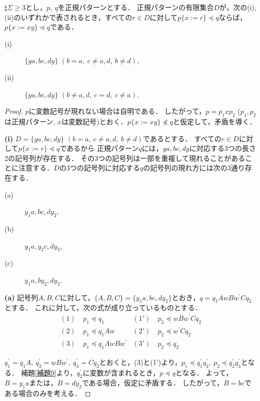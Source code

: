 
\begin{lem}\label{片方}
$\sharp \Sigma \ge 3$とし，$p,~q$を正規パターンとする．
正規パターンの有限集合$D$が，次の{\rm (i), (ii)}のいずれかで表されるとき，すべての$r \in D$に対して$p \{ x := r \} \preceq q$ならば，$p \{ x := xy \} \preceq q$である．

\begin{description}
\item[{\rm (i)}] $\{ ya, bc, dy \}$ $(b = a,~c \not = a,d,~b \not = d)$,
\item[{\rm (ii)}] $\{ ya, bc, dy \}$ $(b \not = a,d,~c = d,~c \not = a)$.
\end{description}
\end{lem}
\begin{proof}
$p$に変数記号が現れない場合は自明である．
したがって，$p=p_{1}xp_{2}$ ($p_{1}, p_{2}$は正規パターン, $x$は変数記号)とおく．$p \{ x := xy \} \not \preceq q$と仮定して，矛盾を導く．

\noindent\textbf{(i)}
$D=\{ ya, bc, dy \}$ $(b = a,~c \not = a,d,~b \not = d)$であるとする．
すべての$r \in D$に対して$p \{ x := r \} \preceq q$であるから
正規パターン$q$には，$ya, bc, dy$に対応する3つの長さ2の記号列が存在する．
その3つの記号列は一部を重複して現れることがあることに注意する．$D$の3つの記号列に対応する$q$の記号列の現れ方には次の3通り存在する．

\begin{description}
\item[(a)] $y_{1}a, bc, dy_{2}$,
\item[(b)] $y_{1}a, y_{2}c, dy_{3}$,
\item[(c)] $y_{1}a, by_{2}, dy_{3}$.
\end{description}

\textbf{(a)}
記号列$A,B,C$に対して，$\{ A,B,C \} = \{ y_{1}a,bc,dy_{2} \}$とおき，$q=q_{1}AwBw^{\prime}Cq_{2}$とする．
これに対して，次の式が成り立っているものとする．
\begin{align*}
(1)~& p_{1} \preceq q_{1} & (1')~& p_{2} \preceq wBw^{\prime}Cq_{2} \\
(2)~& p_{1} \preceq q_{1}Aw & (2')~& p_{2} \preceq w^{\prime}Cq_{2} \\
(3)~& p_{1} \preceq q_{1}AwBw^{\prime} & (3')~& p_{2} \preceq q_{2}
\end{align*}

$q^{\prime}_{1}=q_{1}A,~q^{\prime}_{2}=wBw^{\prime},~q^{\prime}_{3}=Cq_{2}$とおくと，(3)と(1')より，$p_{1} \preceq q^{\prime}_{1}q^{\prime}_{2},~p_{2} \preceq q^{\prime}_{2}q^{\prime}_{3}$となる．
補題\ref{補題9}より，$q^{\prime}_{2}$に変数が含まれるとき，$p \preceq q$となる．
よって，$B=y_{1}a$または，$B=dy_{2}$である場合，仮定に矛盾する．
したがって，$B=bc$である場合のみを考える．


\end{proof}
